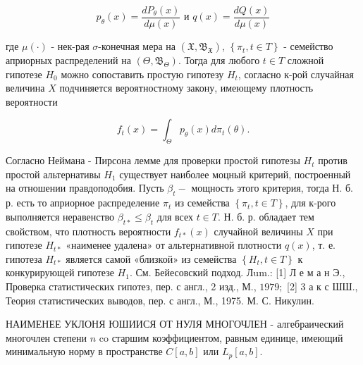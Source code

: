 \documentclass[10pt]{article}
\begin{document}
\[

p_{\theta}(x)=\frac{d P_{\theta}(x)}{d \mu(x)} \text { и } q(x)=\frac{d Q(x)}{d \mu(x)}

\]



где $\mu(\cdot)$ - нек-рая $\sigma$-конечная мера на $\left(\mathfrak{X}, \mathfrak{B}_{\mathfrak{X}}\right)$, $\left\{\pi_{t}, t \in T\right\}$ - семейство априорных распределений на $\left(\Theta, \mathfrak{B}_{\Theta}\right)$. Тогда для любого $t \in T$ сложной гипотезе $H_{0}$ можно сопоставить простую гипотезу $H_{t}$, согласно к-рой случайная величина $X$ подчиняется вероятностному закону, имеющему плотность вероятности



\[

f_{t}(x)=\int_{\Theta} p_{\theta}(x) d \pi_{t}(\theta) .

\]



Согласно Неймана - Пирсона лемме для проверки простой гипотезы $H_{t}$ против простой альтернативы $H_{1}$ существует наиболее моцный критерий, построенный на отношении правдоподобия. Пусть $\beta_{t}-$ мощность этого критерия, тогда Н. б. р. есть то априорное распределение $\pi_{t}$ из семейства $\left\{\pi_{t}, t \in T\right\}$, для к-рого выполняется неравенство $\beta_{t *} \leqslant \beta_{t}$ для всех $t \in T$. Н. б. р. обладает тем свойством, что плотность вероятности $f_{t *}(x)$ случайной величины $X$ при гипотезе $H_{t *}$ «наименее удалена» от альтернативной плотности $q(x)$, т. е. гипотеза $H_{t *}$ является самой «близкой» из семейства $\left\{H_{t}, t \in T\right\}$ к конкурирующей гипотезе $H_{1}$. См. Бейесовский подход. Лum.: [1] Л е м а н Э., Проверка статистических гипотез, пер. с англ., 2 изд., М., $1979 ;$ [2] 3 а к с ШШ., Теория статистических выводов, пер. с англ., М., 1975. М. С. Никулин.



НАИМЕНЕЕ УКЛОНЯ ЮШИИСЯ ОТ НУЛЯ МНОГОЧЛЕН - алгебраический многочлен степени $n$ co старшим коэффициентом, равным единице, имеющий минимальную норму в пространстве $C[a, b]$ или $L_{p}[a, b]$.
\end{document}
